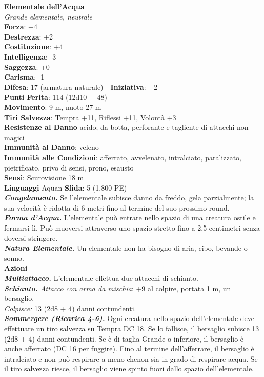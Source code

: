 \begin{multicols}{2}
\medskip\textbf{Elementale dell'Acqua}\\
\emph{Grande elementale, neutrale}\\
\textbf{Forza}: +4\\
\textbf{Destrezza}: +2\\
\textbf{Costituzione}: +4\\
\textbf{Intelligenza}: -3\\
\textbf{Saggezza}: +0\\
\textbf{Carisma}: -1\\
\textbf{Difesa}: 17 (armatura naturale) - \textbf{Iniziativa}: +2\\
\textbf{Punti Ferita}: 114 (12d10 + 48)\\
\textbf{Movimento}: 9 m, nuoto 27 m\\
\textbf{Tiri Salvezza}: Tempra +11, Riflessi +11, Volontà +3\\
\textbf{Resistenze al Danno} acido; da botta, perforante e tagliente di attacchi non magici\\
\textbf{Immunità al Danno}: veleno\\
\textbf{Immunità alle Condizioni}: afferrato, avvelenato, intralciato, paralizzato, pietrificato, privo di sensi, prono, esausto\\
\textbf{Sensi}: Scurovisione 18 m\\
\textbf{Linguaggi} Aquan
\textbf{Sfida}: 5 (1.800 PE)\smallskip\\
\emph{\textbf{Congelamento.}} Se l'elementale subisce danno da freddo, gela parzialmente; la sua velocità è ridotta di 6 metri fino al termine del suo prossimo round.\\
\emph{\textbf{Forma d'Acqua.}} L'elementale può entrare nello spazio di una creatura ostile e fermarsi lì. Può muoversi attraverso uno spazio stretto fino a 2,5 centimetri senza doversi stringere.\\
\emph{\textbf{Natura Elementale.}} Un elementale non ha bisogno di aria, cibo, bevande o sonno.\\
\smallskip\textbf{Azioni}\\
\emph{\textbf{Multiattacco.}} L'elementale effettua due attacchi di schianto.\\
\emph{\textbf{Schianto.} Attacco con arma da mischia}: +9 al colpire, portata 1 m, un bersaglio.\\
\emph{Colpisce:} 13 (2d8 + 4) danni contundenti.\\
\emph{\textbf{Sommergere (Ricarica 4-6).}} Ogni creatura nello spazio dell'elementale deve effettuare un tiro salvezza su Tempra DC  18. Se lo fallisce, il bersaglio subisce 13 (2d8 + 4) danni contundenti. Se è di taglia Grande o inferiore, il bersaglio è anche afferrato (DC  16 per fuggire). Fino al termine dell'afferrare, il bersaglio è intralciato e non può respirare a meno chenon sia in grado di respirare acqua. Se il  tiro salvezza riesce, il bersaglio viene spinto fuori dallo spazio dell'elementale.\\

\end{multicols}
